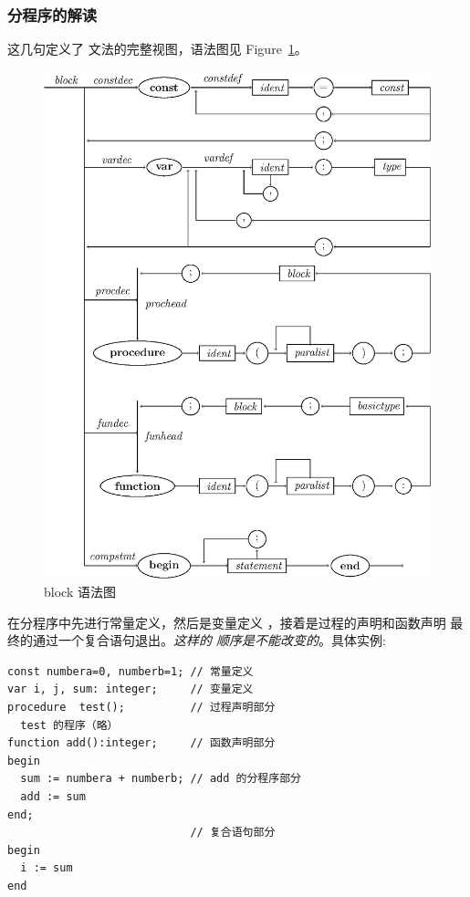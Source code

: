 \subsubsection{分程序的解读}










这几句定义了  文法的完整视图，语法图见 Figure~\ref{block}。
\begin{figure}[!h]
\begin{center}
    \includegraphics[scale=.8]{Figures/block.eps}
\end{center}
\caption{block 语法图}
\label{block}
\end{figure}
在分程序中先进行常量定义，然后是变量定义
 ，接着是过程的声明和函数声明
最终的通过一个复合语句退出。\emph{这样的
顺序是不能改变的}。具体实例:
\begin{verbatim}
const numbera=0, numberb=1; // 常量定义
var i, j, sum: integer;     // 变量定义
procedure  test();          // 过程声明部分
  test 的程序（略）
function add():integer;     // 函数声明部分
begin
  sum := numbera + numberb; // add 的分程序部分
  add := sum
end;
                            // 复合语句部分
begin
  i := sum
end
\end{verbatim}
